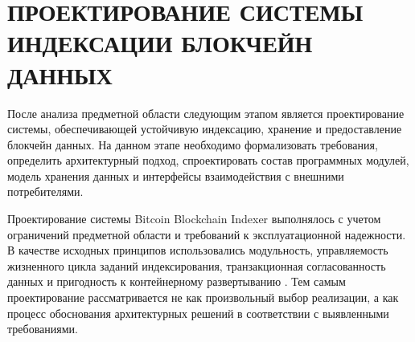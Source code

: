 ﻿\section{ПРОЕКТИРОВАНИЕ СИСТЕМЫ ИНДЕКСАЦИИ БЛОКЧЕЙН ДАННЫХ}

После анализа предметной области следующим этапом является проектирование
системы, обеспечивающей устойчивую индексацию, хранение и предоставление
блокчейн данных. На данном этапе необходимо формализовать требования,
определить архитектурный подход, спроектировать состав программных модулей,
модель хранения данных и интерфейсы взаимодействия с внешними потребителями.

Проектирование системы Bitcoin Blockchain Indexer выполнялось с учетом
ограничений предметной области и требований к эксплуатационной надежности.
В качестве исходных принципов использовались модульность, управляемость
жизненного цикла заданий индексирования, транзакционная согласованность
данных и пригодность к контейнерному развертыванию
\cite{gost_arch, gost_quality, kleppmann2017designing, richards2020fundamentals, postgres_docs}. Тем самым проектирование
рассматривается не как произвольный выбор реализации, а как процесс
обоснования архитектурных решений в соответствии с выявленными требованиями.
